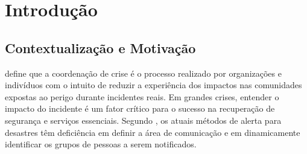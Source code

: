 \documentclass[	12pt, Times, openright, twoside, a4paper, english, brazil]{abntex2}
\begin{document}
\listoffigures*
\cleardoublepage

\listoftables*
\cleardoublepage



\tableofcontents*
\cleardoublepage

\textual

\chapter{Introdução} 
\label{chapter:introducao}

\section{Contextualização e Motivação}

\cite{Cameron:2012:ESA:2187980.2188183} define que a coordenação de crise é o processo realizado por organizações e indivíduos com o intuito de reduzir a experiência dos impactos nas comunidades expostas ao perigo durante incidentes reais. Em grandes crises, entender o impacto do incidente é um fator crítico para o sucesso na recuperação de segurança e serviços essenciais. Segundo \cite{Mehta:2013:CSD:2534303.2534307}, os atuais métodos de alerta para desastres têm deficiência em definir a área de comunicação e em dinamicamente identificar os grupos de pessoas a serem notificados.
\end{document}
